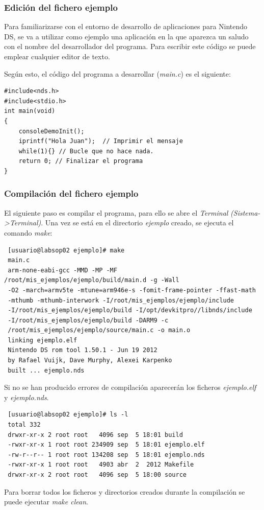 \subsubsection{Edición del fichero ejemplo}
Para familiarizarse con el entorno de desarrollo de aplicaciones para Nintendo DS, se va a utilizar como ejemplo una aplicación en la que aparezca un saludo con el nombre del desarrollador del programa. Para escribir este código se puede emplear cualquier editor de texto.

Según esto, el código del programa a desarrollar (\textit{main.c}) es el siguiente:
\begin{lstlisting}
#include<nds.h>
#include<stdio.h>
int main(void)
{
	consoleDemoInit();
    iprintf("Hola Juan");  // Imprimir el mensaje 
    while(1){} // Bucle que no hace nada.     
    return 0; // Finalizar el programa
}
\end{lstlisting}

\subsubsection{Compilación del fichero ejemplo}
El siguiente paso es compilar el programa, para ello se abre el \textit{Terminal} \textit{(Sistema->Terminal)}. Una vez se está en el directorio \textit{ejemplo} creado, se ejecuta el comando \textit{make}:
\begin{verbatim}
 [usuario@labsop02 ejemplo]# make
 main.c
 arm-none-eabi-gcc -MMD -MP -MF /root/mis_ejemplos/ejemplo/build/main.d -g -Wall 
 -O2 -march=armv5te -mtune=arm946e-s -fomit-frame-pointer -ffast-math 
 -mthumb -mthumb-interwork -I/root/mis_ejemplos/ejemplo/include 
 -I/root/mis_ejemplos/ejemplo/build -I/opt/devkitpro//libnds/include 
 -I/root/mis_ejemplos/ejemplo/build -DARM9 -c 
 /root/mis_ejemplos/ejemplo/source/main.c -o main.o 
 linking ejemplo.elf
 Nintendo DS rom tool 1.50.1 - Jun 19 2012
 by Rafael Vuijk, Dave Murphy, Alexei Karpenko
 built ... ejemplo.nds
\end{verbatim}

Si no se han producido errores de compilación aparecerán los ficheros \textit{ejemplo.elf} y \textit{ejemplo.nds}.
\begin{verbatim}
 [usuario@labsop02 ejemplo]# ls -l
 total 332
 drwxr-xr-x 2 root root   4096 sep  5 18:01 build
 -rwxr-xr-x 1 root root 234909 sep  5 18:01 ejemplo.elf
 -rw-r--r-- 1 root root 134208 sep  5 18:01 ejemplo.nds
 -rwxr-xr-x 1 root root   4903 abr  2  2012 Makefile
 drwxr-xr-x 2 root root   4096 sep  5 18:00 source
                \end{verbatim}
Para borrar todos los ficheros y directorios creados durante la compilación se puede ejecutar \textit{make clean}.

